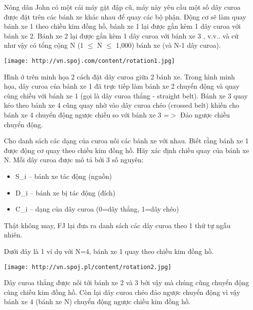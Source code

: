 Nông dân John có một cái máy gặt đập cũ, máy này yêu cầu một số dây  curoa được đặt trên các bánh xe khác nhau để quay các bộ phận. Động cơ sẽ làm quay bánh xe 1 theo chiều kim đồng hồ, bánh xe 1 lại được gắn kèm 1  dây curoa với bánh xe 2. Bánh xe 2 lại được gắn kèm 1 dây curoa với bánh xe 3  , v.v.. và cứ như vậy có tổng cộng N (1  $\le$  N  $\le$  1,000) bánh xe (và N-1 dây curoa).  


\texttt{[image: http://vn.spoj.com/content/rotation1.jpg]}

   Hình ở trên minh họa 2 cách đặt dây curoa giữa 2 bánh xe. Trong hình minh họa, dây curoa của bánh xe 1 đã trực tiếp làm bánh xe 2 chuyển động và quay cùng chiều với bánh xe 1 (gọi là dây curoa thẳng - straight belt). Bánh xe 3 quay kéo theo bánh xe 4 cũng quay nhờ vào dây curoa chéo (crossed belt) khiến cho bánh xe 4 chuyển động ngược chiều so với bánh xe 3 =$>$ Đảo  ngược chiều chuyển động.  

   Cho danh sách các dạng của curoa nối các bánh xe với nhau.  Biết rằng bánh xe 1 được động cơ quay theo chiều kim đồng hồ. Hãy xác định chiều quay của bánh xe N. Mỗi dây curoa được mô tả bởi 3 số nguyên:  
\begin{itemize}
	\item     S\_i -- bánh xe tác động (nguồn)   
	\item     D\_i -- bánh xe bị tác động (đích)   
	\item     C\_i -- dạng của dây curoa (0=dây thẳng, 1=dây chéo)   
\end{itemize}

   Thật không may, FJ lại đưa ra danh sách các dây curoa theo 1 thứ tự ngẫu nhiên.  

   Dưới đây là 1 ví dụ với N=4, bánh xe 1 quay theo chiều kim đồng hồ.  


\texttt{[image: http://vn.spoj.pl/content/rotation2.jpg]}

   Dây curoa thẳng được nối tới bánh xe 2 và 3 bởi vậy mà chúng cũng chuyển động cùng chiều kim đồng hồ. Còn lại dây curoa chéo đảo ngược chuyển động vì vậy  bánh xe 4 (bánh xe N) chuyển động ngược chiều kim đồng hồ.  

\